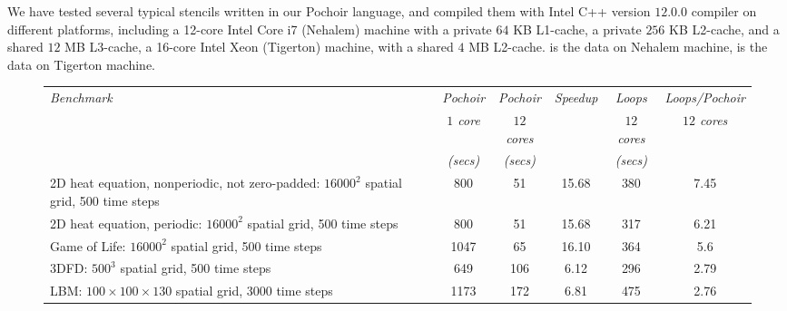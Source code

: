 



We have tested several typical stencils written in our Pochoir
language, and compiled them with Intel C++ version $12.0.0$ compiler 
on different platforms, including a 12-core Intel Core i7 (Nehalem) machine
with a private $64$ KB L1-cache, a private $256$ KB L2-cache, and a 
shared $12$ MB L3-cache, a 16-core Intel Xeon (Tigerton) machine, with a shared
$4$ MB L2-cache.  is the data on Nehalem machine, 
is the data on Tigerton machine.

\begin{figure*}
\center\small
\begin{tabular}{|m{7cm}|c|c|c|c|c|}
\hline
\multirow{2}{*}{\textit{Benchmark}} &  \textit{Pochoir}  & \textit{Pochoir}    & \multirow{2}{*}{\textit{Speedup}} & \textit{Loops}      & \textit{Loops/Pochoir} \\
                                    &  \textit{$1$ core} & \textit{$12$ cores} &                                   & \textit{$12$ cores} & \textit{$12$ cores}    \\
                                    &  \textit{(secs)}   & \textit{(secs)}     &                                   & \textit{(secs)}     &                        \\\hline
2D heat equation, nonperiodic, not zero-padded: $16000^2$ spatial grid, 500 time steps  & 800 & 51 & 15.68 & 380 & 7.45 \\\hline
2D heat equation, periodic: $16000^2$ spatial grid, 500 time steps                      & 800 & 51 & 15.68 & 317 & 6.21 \\\hline
Game of Life: $16000^2$ spatial grid, 500 time steps                                    & 1047 & 65 & 16.10 & 364 & 5.6 \\\hline
3DFD: $500^3$ spatial grid, 500 time steps                                             & 649 & 106 & 6.12 & 296 & 2.79 \\\hline
LBM: $100 \times 100 \times 130$ spatial grid, 3000 time steps                         & 1173 & 172 & 6.81 & 475 & 2.76 \\\hline

\end{tabular}
\end{figure*}
